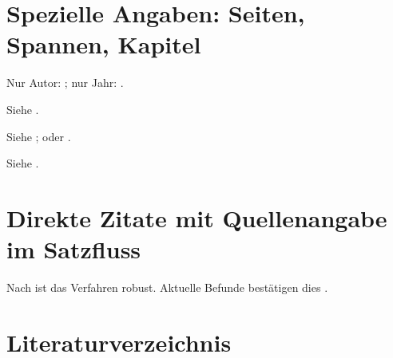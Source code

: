 \documentclass[11pt]{scrbook}
\begin{document}
\section{Spezielle Angaben: Seiten, Spannen, Kapitel}
Nur Autor: \citeauthor{muster2020}; nur Jahr: \citeyear{muster2020}.

Siehe \parencite[15--18]{muster2020}.

Siehe \parencite[Kap.~4]{muster2020}; oder \parencite[§\,2]{alpha2018}.

Siehe \parencite[vgl. auch][Anhang~B]{muster2020}.

\section{Direkte Zitate mit Quellenangabe im Satzfluss}
Nach \textcite[45]{muster2020} ist das Verfahren robust.
Aktuelle Befunde bestätigen dies \parencite[45]{muster2020}.

\section{Literaturverzeichnis}
\printbibliography
\end{document}
